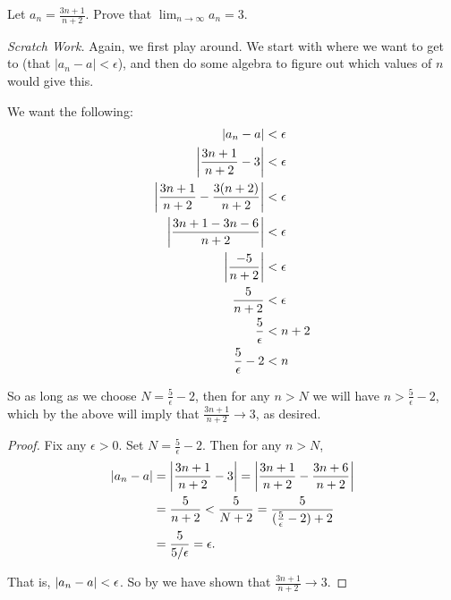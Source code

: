 \begin{example}
  Let $a_n = \frac{3n+1}{n+2}$. Prove that $\lim_{n\to\infty} a_n = 3$.

  \textit{Scratch Work.} Again, we first play around. We start with
  where we want to get to (that $|a_n - a| < \epsilon$), and then
  do some algebra to figure out which values of $n$ would give this.

  We want the following:
  \begin{align*}
    | a_n - a | &< \epsilon\\
    \left|\frac{3n+1}{n+2} - 3\right| &< \epsilon\\
    \left|\frac{3n+1}{n+2} - \frac{3(n+2)}{n+2}\right| &< \epsilon\\
    \left|\frac{3n+1-3n-6}{n+2}\right| &< \epsilon\\
    \left|\frac{-5}{n+2}\right| &< \epsilon\\
    \frac{5}{n+2} &< \epsilon\\
    \frac{5}{\epsilon} &< n+2\\
    \frac{5}{\epsilon} - 2 &< n
  \end{align*}

  So as long as we choose $N = \frac{5}{\epsilon} - 2$, then for
  any $n > N$ we will have $n > \frac{5}{\epsilon} - 2$, which by
  the above will imply that $\frac{3n+1}{n+2} \to 3$, as desired.

  \begin{proof}
    Fix any $\epsilon > 0$. Set $N = \frac{5}{\epsilon} - 2$.
    Then for any $n > N$,
    \begin{align*}
      | a_n - a | &= \left|\frac{3n+1}{n+2} - 3\right| =
      \left|\frac{3n+1}{n+2} - \frac{3n+6}{n+2}\right|\\
      &= \frac{5}{n+2} < \frac{5}{N+2} =
      \frac{5}{(\frac{5}{\epsilon} - 2) + 2}\\
      &= \frac{5}{5/\epsilon} = \epsilon.
    \end{align*}

    That is, $| a_n - a | < \epsilon$. So by
     we have
    shown that $\frac{3n+1}{n+2} \to 3$.
  \end{proof}
\end{example}

